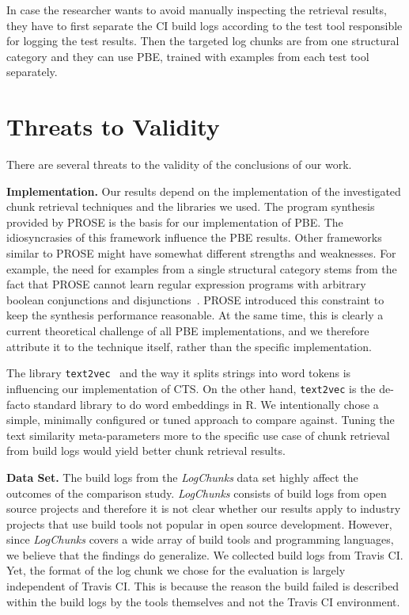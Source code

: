 In case the researcher wants to avoid manually inspecting the
retrieval results, they have to first separate the CI build logs
according to the test tool responsible for logging the test results.
Then the targeted log chunks are from one structural category and they
can use PBE, trained with examples from each test tool separately.

\section{Threats to Validity}
There are several threats to the validity of the conclusions of our
work.

\textbf{Implementation.}
Our results depend on the implementation of the investigated chunk
retrieval techniques and the libraries we used.
The program synthesis provided by PROSE is the basis for our
implementation of PBE\@.
The
idiosyncrasies of this framework influence the PBE results.
Other
frameworks similar to PROSE might have somewhat different strengths
and weaknesses.
For example, the need for examples from a single
structural category stems from the fact that PROSE cannot learn
regular expression programs with arbitrary boolean conjunctions and
disjunctions~\cite{mayer2015user}.
PROSE introduced this constraint to
keep the synthesis performance reasonable.
At the same time, this is
clearly a current theoretical challenge of all PBE implementations,
and we therefore attribute it to the technique itself, rather than the
specific implementation.

The library
{\tt text2vec}~\cite{text2vec2019webpage}
and the way it splits strings into word tokens is influencing
our implementation of CTS\@.
On the other hand,
{\tt text2vec} is the de-facto standard library to do word embeddings
in R.
We intentionally chose a simple, minimally configured or tuned
approach to compare against.
Tuning the text similarity
meta-parameters more to the specific use case of chunk retrieval from
build logs would yield better chunk retrieval results.


\textbf{Data Set.}
The build logs from the \emph{LogChunks} data set highly affect
the outcomes of the comparison study.
\emph{LogChunks} consists of build
logs from open source projects and therefore it is not clear whether
our results apply to industry projects that use build tools
not popular in open source development.
However, since \emph{LogChunks} covers a wide array of build tools and
programming languages,
we believe that the findings do generalize.
We collected build logs from Travis CI.
Yet, the format of the log chunk we chose
for the evaluation is largely independent of Travis CI\@.
This
is because the reason the build failed is described within the build
logs by the tools themselves and not the Travis CI environment.

